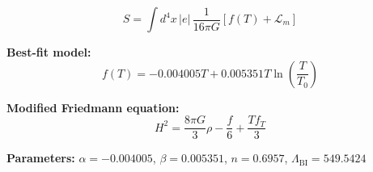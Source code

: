 
\begin{equation}
  S = \int d^4x \, |e| \, \frac{1}{16\pi G} \left[ f(T) + \mathcal{L}_m \right]
\end{equation}

\textbf{Best-fit model:}
\begin{equation}
  f(T) = -0.004005 T + 0.005351 T \ln\!\left(\frac{T}{T_0}\right)
\end{equation}

\textbf{Modified Friedmann equation:}
\begin{equation}
  H^2 = \frac{8\pi G}{3} \rho - \frac{f}{6} + \frac{T f_T}{3}
\end{equation}

\textbf{Parameters:}
$\alpha = -0.004005$, \quad
$\beta = 0.005351$, \quad
$n = 0.6957$, \quad
$\Lambda_{\text{BI}} = 549.5424$
